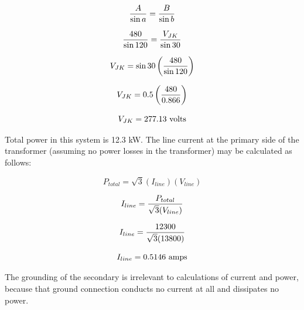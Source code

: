 $${A \over \sin a} = {B \over \sin b}$$

$${480 \over \sin 120} = {V_{JK} \over \sin 30}$$

$$V_{JK} = \sin 30 \left({480 \over \sin 120}\right)$$

$$V_{JK} = 0.5 \left({480 \over 0.866}\right)$$

$$V_{JK} = 277.13 \hbox{ volts}$$

\filbreak

Total power in this system is 12.3 kW.  The line current at the primary side of the transformer (assuming no power losses in the transformer) may be calculated as follows:

$$P_{total} = \sqrt{3} (I_{line}) (V_{line})$$

$$I_{line} = {P_{total} \over \sqrt{3} (V_{line})}$$

$$I_{line} = {12300 \over \sqrt{3} (13800)}$$

$$I_{line} = 0.5146 \hbox{ amps}$$

The grounding of the secondary is irrelevant to calculations of current and power, because that ground connection conducts no current at all and dissipates no power.











